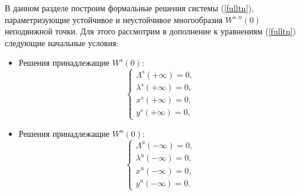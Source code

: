 В данном разделе построим формальные решения системы (\ref{fulltn}), параметризующие устойчивое и неустойчивое многообразия $W^{s,u}(0)$ неподвижной точки. Для этого рассмотрим в дополнение к уравнениям (\ref{fulltn}) следующие начальные условия:
    
\begin{itemize}
\item Решения принадлежащие $W^s(0)$:
\begin{equation*}
    \begin{cases}
        \Lambda^{s}(+ \infty) = 0, \\
        \lambda^{s}(+ \infty) = 0,\\
        x^{s}(+ \infty) = 0, \\
        y^{s}(+ \infty) = 0,
    \end{cases}
    \label{border}
\end{equation*}
\item Решения принадлежащие $W^u(0)$:
\begin{equation*}
    \begin{cases}
        \Lambda^{u}(- \infty) = 0, \\
        \lambda^{u}(- \infty) = 0,\\
        x^{u}(- \infty) = 0, \\
        y^{u}(- \infty) = 0.
    \end{cases}
\end{equation*}
\end{itemize}

   

